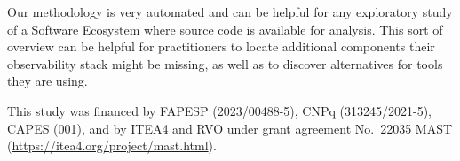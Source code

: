 \documentclass[sigconf]{acmart}
\begin{document}
Our methodology is very automated and can be helpful for any exploratory
study of a Software Ecosystem where source code is available for
analysis. This sort of overview can be helpful for practitioners to
locate additional components their observability stack might be missing,
as well as to discover alternatives for tools they are using.

\begin{acks}

This study was financed by FAPESP (2023/00488-5), CNPq (313245/2021-5),
CAPES (001), and by ITEA4 and RVO under grant agreement No.~22035 MAST
(\url{https://itea4.org/project/mast.html}).

\end{acks}




\appendix

\onecolumn
\end{document}
